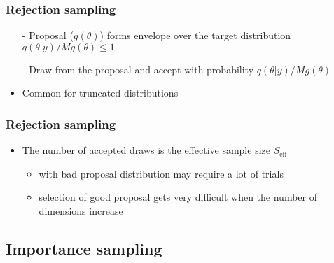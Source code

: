 \documentclass[10pt]{beamer}
\begin{document}
\begin{frame}

\frametitle{Rejection sampling}

    \vspace{-.3\baselineskip}
  \begin{itemize}
  \item[-] Proposal ($g(\theta)$) forms envelope over the target distribution ${q(\theta|y)}/{M g(\theta)} \leq 1$
  \item[-] Draw from the proposal and accept with probability ${q(\theta|y)}/{M g(\theta)}$
  \item<3>[-] Common for truncated distributions
  \end{itemize}

  \begin{center}
    \vspace{-1.6\baselineskip}
  \end{center}

\end{frame}

\begin{frame}
\frametitle{Rejection sampling}

\begin{itemize}
  \item The number of accepted draws is the effective sample size $S_\text{eff}$

  \pause
    \begin{itemize}
    \item with bad proposal distribution may require a lot of trials
    \item selection of good proposal gets very difficult when
      the number of dimensions increase
    \end{itemize}
  \end{itemize}

\end{frame}

\subsection{Importance sampling}
\end{document}
